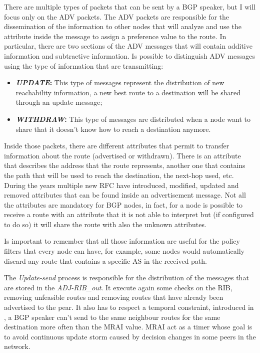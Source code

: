 There are multiple types of packets that can be sent by a \ac{BGP} speaker, but
I will focus only on the \ac{ADV} packets.
The \ac{ADV} packets are responsible for the dissemination of the information
to other nodes that will analyze and use the attribute inside the message
to assign a preference value to the route.
In particular, there are two sections of the \ac{ADV} messages that will
contain additive information and subtractive information.
Is possible to distinguish \ac{ADV} messages using the type of information that are
transmitting:
\begin{itemize}
	\item \textbf{\textit{UPDATE}:} This type of messages represent the distribution
		of new reachability information, a new best route to a destination will be
		shared through an update message;
	\item \textbf{\textit{WITHDRAW}:} This type of messages are distributed when
		a node want to share that it doesn't know how to reach
		a destination anymore.
\end{itemize}
Inside those packets, there are different attributes that permit to transfer
information about the route (advertised or withdrawn).
There is an attribute that describes the address that the route represents,
another one that contains the path that will be used to reach the
destination, the next-hop used, etc.
During the years multiple new \ac{RFC} have introduced, modified, updated and removed
attributes that can be found inside an advertisement message.
Not all the attributes are mandatory for \ac{BGP} nodes, in fact, for a node
is possible to receive a route with an attribute that it is not able to interpret
but (if configured to do so) it will share the route with also the unknown
attributes.

Is important to remember that all those information are useful for the policy
filters that every node can have, for example, some nodes would automatically discard
any route that contains a specific \ac{AS} in the received path.

The \textit{Update-send} process is responsible for the distribution of the
messages that are stored in the \textit{ADJ-RIB\_out}.
It execute again some checks on the \ac{RIB}, removing unfeasible routes
and removing routes that have already been advertised to the pear.
It also has to respect a temporal constraint, introduced in \cite{rfc4271},
a \ac{BGP} speaker can't send to the same neighbour routes for the same destination
more often than the \ac{MRAI} value.
\ac{MRAI} act as a timer whose goal is to avoid continuous update storm caused
by decision changes in some peers in the network.

